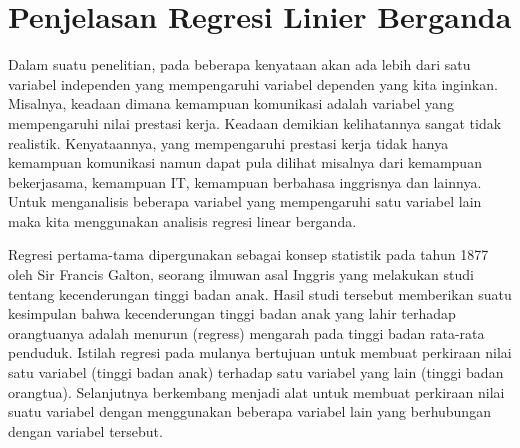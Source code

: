 \section{Penjelasan Regresi Linier Berganda}
\par Dalam suatu penelitian, pada beberapa kenyataan akan ada lebih dari satu variabel independen yang mempengaruhi variabel dependen yang kita inginkan. Misalnya, keadaan dimana kemampuan komunikasi adalah variabel yang mempengaruhi nilai prestasi kerja. Keadaan demikian kelihatannya sangat tidak realistik. Kenyataannya, yang mempengaruhi prestasi kerja tidak hanya kemampuan komunikasi namun dapat pula dilihat misalnya dari kemampuan bekerjasama, kemampuan IT, kemampuan berbahasa inggrisnya dan lainnya. Untuk menganalisis beberapa variabel yang mempengaruhi satu variabel lain maka kita menggunakan analisis regresi linear berganda.      
\par Regresi pertama-tama dipergunakan sebagai konsep statistik pada tahun 1877 oleh Sir Francis Galton, seorang ilmuwan asal Inggris yang melakukan studi tentang kecenderungan tinggi badan anak. Hasil studi tersebut memberikan suatu kesimpulan bahwa kecenderungan tinggi badan anak yang lahir terhadap orangtuanya adalah menurun (regress) mengarah pada tinggi badan rata-rata penduduk. Istilah regresi pada mulanya bertujuan untuk membuat perkiraan nilai satu variabel (tinggi badan anak) terhadap satu variabel yang lain (tinggi badan orangtua). Selanjutnya berkembang menjadi alat untuk membuat perkiraan nilai suatu variabel dengan menggunakan beberapa variabel lain yang berhubungan dengan variabel tersebut. 

